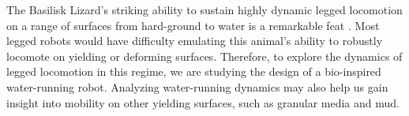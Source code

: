 The Basilisk Lizard's striking ability to sustain highly dynamic legged locomotion on a range of surfaces from hard-ground to water is a remarkable feat \cite{glasheen1996hydrodynamic}. Most legged robots would have difficulty emulating this animal's ability to robustly locomote on yielding or deforming surfaces. Therefore, to explore the dynamics of legged locomotion in this regime, we are studying the design of a bio-inspired water-running robot. Analyzing water-running dynamics may also help us gain insight into mobility on other yielding surfaces, such as granular media and mud.
